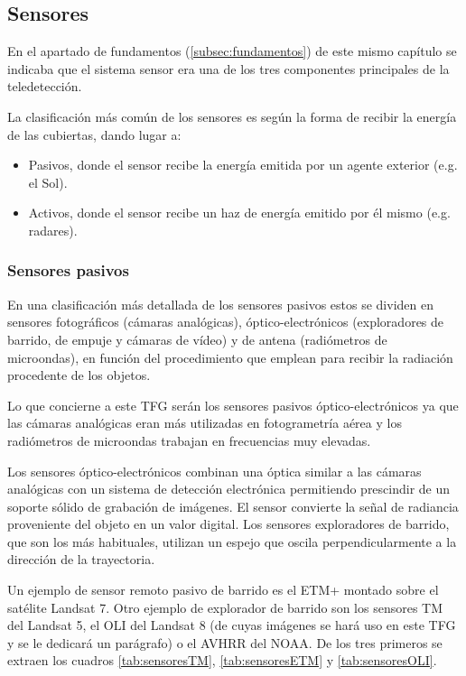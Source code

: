\subsection{Sensores}
\label{subsec:sensores}
En el apartado de fundamentos (\ref{subsec:fundamentos}) de este mismo capítulo se indicaba que el sistema sensor era una de los tres componentes principales de la teledetección.\Sep

La clasificación más común de los sensores es según la forma de recibir la energía de las cubiertas, dando lugar a:
\begin{itemize}
	\item Pasivos, donde el sensor recibe la energía emitida por un agente exterior (e.g. el Sol).
	\item Activos, donde el sensor recibe un haz de energía emitido por él mismo (e.g. radares).
\end{itemize}

\subsubsection{Sensores pasivos} \label{subsubsec:sensorespasivos}
En una clasificación más detallada de los sensores pasivos estos se dividen en sensores fotográficos (cámaras analógicas), óptico-electrónicos (exploradores de barrido, de empuje y cámaras de vídeo) y de antena (radiómetros de microondas), en función del procedimiento que emplean para recibir la radiación procedente de los objetos.\Sep

Lo que concierne a este \ac{TFG} serán los sensores pasivos óptico-electrónicos ya que las cámaras analógicas eran más utilizadas en fotogrametría aérea y los radiómetros de microondas trabajan en frecuencias muy elevadas.\Sep

Los sensores óptico-electrónicos combinan una óptica similar a las cámaras analógicas con un sistema de detección electrónica permitiendo prescindir de un soporte sólido de grabación de imágenes. El sensor convierte la señal de radiancia proveniente del objeto en un valor digital. Los sensores exploradores de barrido, que son los más habituales, utilizan un espejo que oscila perpendicularmente a la dirección de la trayectoria.\Sep

Un ejemplo de sensor remoto pasivo de barrido es el \ac{ETM+} montado sobre el satélite Landsat 7. Otro ejemplo de explorador de barrido son los sensores \ac{TM} del Landsat 5, el \ac{OLI} del Landsat 8 (de cuyas imágenes se hará uso en este \ac{TFG} y se le dedicará un parágrafo) o el \ac{AVHRR} del NOAA. De los tres primeros se extraen los cuadros \ref{tab:sensoresTM}, \ref{tab:sensoresETM} y \ref{tab:sensoresOLI}.\Sep

